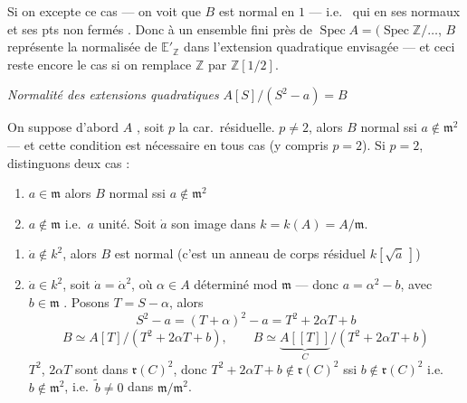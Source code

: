 \documentclass[11pt,a4paper]{article}
\begin{document}
Si on excepte ce cas --- on voit que $B$ est normal en
 $1$ --- i.e.\  qui en ses
  
normaux et ses pts non fermés . Donc à un
\struck{\ill{}} ensemble fini près de $\operatorname{Spec} A = (\operatorname{Spec}
\mathbb{Z}/\ldots$, $B$ représente la normalisée de $\mathbb{E}'_{\mathbb{Z}}$
dans l'extension quadratique envisagée --- et ceci reste encore le cas si on
remplace $\mathbb{Z}$ par $\mathbb{Z}[1/2]$.


\emph{Normalité des extensions quadratiques} $A[S]/(S^2 - a) = B$

On suppose d'abord $A$   ,
soit $p$ la car.\ résiduelle. 
$p \neq 2$, alors $B$ normal ssi $a \notin \mathfrak{m}^2$ --- et cette condition
est nécessaire en tous cas (y compris $p = 2$). Si $p = 2$, distinguons deux cas :

\begin{enumerate}
\item[a)] $a \in \mathfrak{m}$ \quad alors $B$ normal ssi $a \notin \mathfrak{m}^2$
\item[b)] $a \notin \mathfrak{m}$ i.e.\ $a$ unité. Soit $\dot a$ son image dans
$k = k(A) = A/\mathfrak{m}$.
\end{enumerate}
\begin{enumerate}
\item[$1^\circ$)] $\dot a \notin k^2$, alors $B$ est normal (c'est un
anneau  de corps résiduel $k[\sqrt{\dot a}\,]$)
\item[$2^\circ$)] $\dot a \in k^2$, soit $\dot a = \dot\alpha^2$, où $\alpha \in A$
déterminé mod $\mathfrak{m}$ --- donc $a = \alpha^2 - b$, avec
$b \in \mathfrak{m}$ . Posons $T = S - \alpha$,
alors
\[
S^2 - a = (T + \alpha)^2 - a = T^2 + 2\alpha T + b
\]
\[
B \simeq A[T]/(T^2 + 2\alpha T + b), \qquad
\hat B \simeq \underbrace{A[[T]]}_{C}/(T^2 + 2\alpha T + b)
\]
$T^2$, $2\alpha T$ sont dans $\mathfrak{r}(C)^2$, donc
$T^2 + 2\alpha T + b \notin \mathfrak{r}(C)^2$ ssi $b \notin \mathfrak{r}(C)^2$
i.e.\ $b \notin \mathfrak{m}^2$, i.e.\ $\tilde b \neq 0$ dans
$\mathfrak{m}/\mathfrak{m}^2$.
\end{enumerate}
\end{document}
